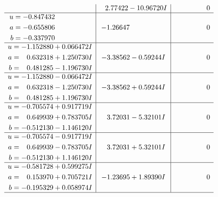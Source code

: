 \documentclass[1p]{elsarticle_modified}
\theoremstyle{definition}
\begin{document}
$$\begin{array}{c|c|c}
 & \phantom{-}2.77422 - 10.96720 I & \phantom{-0.000000 } 0 \\ \hline\begin{aligned}
u &= -0.847432\phantom{ +0.000000I} \\
a &= -0.655806\phantom{ +0.000000I} \\
b &= -0.337970\phantom{ +0.000000I}\end{aligned}
 & -1.26647\phantom{ +0.000000I} & \phantom{-0.000000 } 0 \\ \hline\begin{aligned}
u &= -1.152880 + 0.066472 I \\
a &= \phantom{-}0.632318 + 1.250730 I \\
b &= \phantom{-}0.481285 - 1.196730 I\end{aligned}
 & -3.38562 - 0.59244 I & \phantom{-0.000000 } 0 \\ \hline\begin{aligned}
u &= -1.152880 - 0.066472 I \\
a &= \phantom{-}0.632318 - 1.250730 I \\
b &= \phantom{-}0.481285 + 1.196730 I\end{aligned}
 & -3.38562 + 0.59244 I & \phantom{-0.000000 } 0 \\ \hline\begin{aligned}
u &= -0.705574 + 0.917719 I \\
a &= \phantom{-}0.649939 + 0.783705 I \\
b &= -0.512130 - 1.146120 I\end{aligned}
 & \phantom{-}3.72031 - 5.32101 I & \phantom{-0.000000 } 0 \\ \hline\begin{aligned}
u &= -0.705574 - 0.917719 I \\
a &= \phantom{-}0.649939 - 0.783705 I \\
b &= -0.512130 + 1.146120 I\end{aligned}
 & \phantom{-}3.72031 + 5.32101 I & \phantom{-0.000000 } 0 \\ \hline\begin{aligned}
u &= -0.581728 + 0.599275 I \\
a &= \phantom{-}0.153970 + 0.705721 I \\
b &= -0.195329 + 0.058974 I\end{aligned}
 & -1.23695 + 1.89390 I & \phantom{-0.000000 } 0\\
 \hline 
 \end{array}$$\newpage$$\begin{array}{c|c|c}  

\end{array}$$
\end{document}
